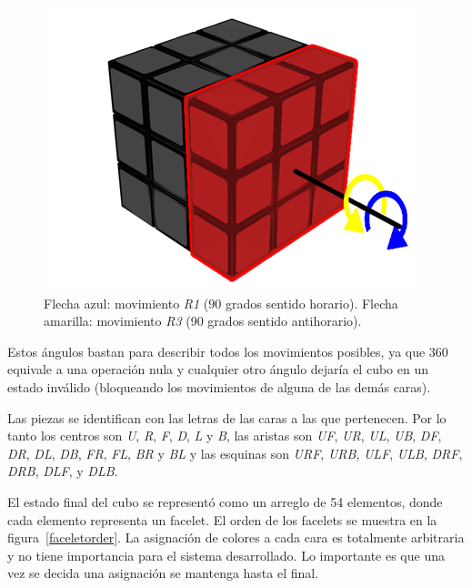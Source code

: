 \begin{figure}[h!]
	\centering
	\includegraphics[scale=0.3]{figures/R1}
	\caption{Flecha azul: movimiento \textit{R1} ($90$ grados sentido horario). Flecha amarilla: movimiento \textit{R3} (90 grados sentido antihorario).}
	\label{moveR}
\end{figure}

Estos ángulos bastan para describir todos los movimientos posibles, ya que 360 equivale a una operación nula y cualquier otro ángulo dejaría el cubo en un estado inválido (bloqueando los movimientos de alguna de las demás caras).

Las piezas se identifican con las letras de las caras a las que pertenecen. Por lo tanto los centros son \textit{U}, \textit{R}, \textit{F}, \textit{D}, \textit{L} y \textit{B}, las aristas son \textit{UF}, \textit{UR}, \textit{UL}, \textit{UB}, \textit{DF}, \textit{DR}, \textit{DL}, \textit{DB}, \textit{FR}, \textit{FL}, \textit{BR} y \textit{BL} y las esquinas son \textit{URF}, \textit{URB}, \textit{ULF}, \textit{ULB}, \textit{DRF}, \textit{DRB}, \textit{DLF}, y \textit{DLB}.

El estado final del cubo se representó como un arreglo de 54 elementos, donde cada elemento representa un facelet. El orden de los facelets se muestra en la figura~\ref{faceletorder}.
La asignación de colores a cada cara es totalmente arbitraria y no tiene importancia para el sistema desarrollado. Lo importante es que una vez se decida una asignación se mantenga hasta el final.


